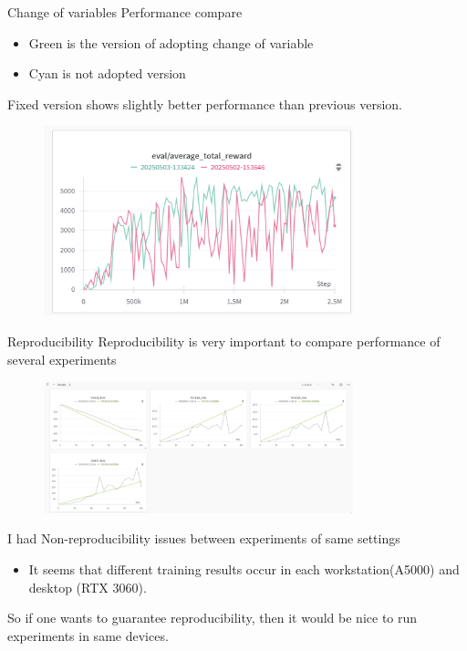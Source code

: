 \documentclass[8pt]{beamer}
\begin{document}
\begin{frame}{Change of variables}
    Performance compare
    \begin{itemize}
        \item Green is the version of adopting change of variable
        \item Cyan is not adopted version
    \end{itemize}
    Fixed version shows slightly better performance than previous version.
    \begin{figure}
        \centering
        \includegraphics[width=0.8\textwidth]{CovReturns.png}
    \end{figure}
\end{frame}

\begin{frame}{Reproducibility}
    Reproducibility is very important to compare performance of several experiments
    \begin{figure}
        \centering
        \includegraphics[width=0.8\textwidth]{UnmatchedReprod.png}
    \end{figure}
    I had Non-reproducibility issues between experiments of same settings
    \begin{itemize}
        \item It seems that different training results occur in each workstation(A5000) and desktop (RTX 3060).
    \end{itemize}
    So if one wants to guarantee reproducibility, then it would be nice to run experiments in same devices.
\end{frame}
\end{document}
